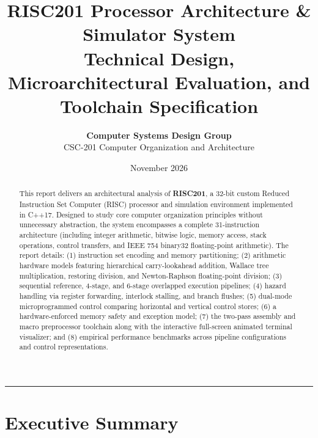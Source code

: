 \documentclass[11pt,a4paper]{article}
\title{\textbf{RISC201 Processor Architecture \& Simulator System}\\[0.2em]
\large Technical Design, Microarchitectural Evaluation, and Toolchain Specification}
\author{\textbf{Computer Systems Design Group} \\ CSC-201 Computer Organization and Architecture}
\date{November 2026}
\begin{document}
\maketitle

\begin{abstract}
This report delivers an architectural analysis of \textbf{RISC201}, a 32-bit custom Reduced Instruction Set Computer (RISC) processor and simulation environment implemented in C++17. Designed to study core computer organization principles without unnecessary abstraction, the system encompasses a complete 31-instruction architecture (including integer arithmetic, bitwise logic, memory access, stack operations, control transfers, and IEEE 754 binary32 floating-point arithmetic). The report details: (1) instruction set encoding and memory partitioning; (2) arithmetic hardware models featuring hierarchical carry-lookahead addition, Wallace tree multiplication, restoring division, and Newton-Raphson floating-point division; (3) sequential reference, 4-stage, and 6-stage overlapped execution pipelines; (4) hazard handling via register forwarding, interlock stalling, and branch flushes; (5) dual-mode microprogrammed control comparing horizontal and vertical control stores; (6) a hardware-enforced memory safety and exception model; (7) the two-pass assembly and macro preprocessor toolchain along with the interactive full-screen animated terminal visualizer; and (8) empirical performance benchmarks across pipeline configurations and control representations.
\end{abstract}

\vspace{0.5em}
\hrule
\vspace{1em}

\section{Executive Summary}
\end{document}
